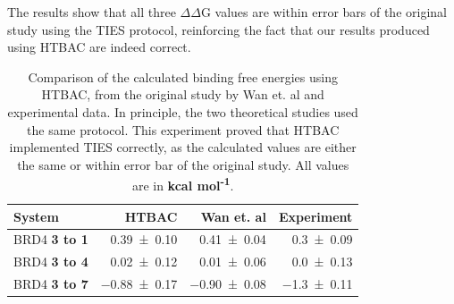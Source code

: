 The results show that all three $\Delta \Delta$G values are within error bars
of the original study using the TIES protocol, reinforcing the fact that our
results produced using HTBAC are indeed correct.

\begin{table}
  \centering
  \caption{Comparison of the calculated binding free energies using HTBAC,
  from the original study by Wan et. al and experimental data. In principle,
  the two theoretical studies used the same protocol. This experiment proved
  that HTBAC implemented TIES correctly, as the calculated values are either
  the same or within error bar of the original study. All values are in
  \textbf{kcal mol\textsuperscript{-1}}.}  %
  \begin{tabular}{lrrr}
    \toprule
    System & HTBAC & Wan et. al & Experiment \\
    \midrule
    BRD4 \textbf{3 to 1} & \num{0.39 +- 0.10} &   \num{0.41 +- 0.04} &  \num{0.3 +- 0.09} \\
    BRD4 \textbf{3 to 4} & \num{0.02 +- 0.12} &   \num{0.01 +- 0.06} &  \num{0.0 +- 0.13} \\
    BRD4 \textbf{3 to 7} & \num{-0.88 +- 0.17} &  \num{-0.90 +- 0.08} & \num{-1.3 +- 0.11} \\
    \bottomrule
  \end{tabular}
  \label{tab:exp2}
\end{table}





